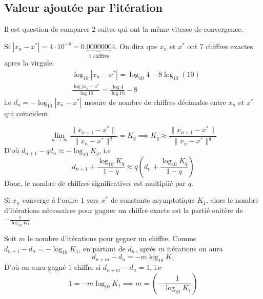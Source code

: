\documentclass[a4paper]{report}
\begin{document}
\subsection{Valeur ajoutée par l'itération}
Il est question de comparer $2$ suites qui ont la même vitesse de convergence.
\begin{remark}
    Si $|x_n - x^*| = 4 \cdot 10^{-8} = 0.\underbrace{0000000}_{7 \text{ chiffres}}4$. On dira que $x_n$ et  $x^*$ ont 7 chiffres exactes apres la virgule.
    \begin{align*}
    &\log_{10} |x_n - x^*| = \log_{10}4 - 8\log_{10}(10)\\
    &\frac{\log|x_n - x^*}{\log 10} = \frac{\log 4}{\log 10} - 8
    \end{align*}
    i.e $d_n = - \log_{10} |x_n - x^*|$ mesure de nombre de chiffres décimales entre $x_n$ et  $x^*$ qui coincident.
\end{remark}
\begin{remark}
   \[
       \lim_{n \to \infty} \frac{\|x_{n+1} - x^*\|}{\|x_n - x^*\|^q} = K_q \implies K_q \approx \frac{\|x_{n+1} - x^*\|}{\|x_n - x^*\|^q}
   \]  
   D'où $d_{n+1} - q d_n \approx -\log_{10} K_q$, i.e
   \[
   d_{n+1} + \frac{\log_{10} K_q}{1 - q} \approx q(d_n + \frac{\log_{10} K_q}{1 - q})
   \] 
   Donc, le nombre de chiffres significatives est multiplié par $q$.
\end{remark}
\begin{prop}
   Si $x_n$ converge à l'ordre  $1$ vers  $x^*$ de constante asymptotique  $K_1$, alors le nombre d'itérations nécessaires pour gagner un chiffre exacte est la partié enitère de  $-\frac{1}{\log_{10}K_1}$ 
\end{prop}
\begin{preuve}
Soit $m$ le nombre d'itérations pour gegner un chiffre. Comme  $d_{n+1} - d_n = -\log_{10} K_1$, en partant de $d_n$, après  $m$ itérations on aura
 \[
     d_{n+m} - d_{n} = -m \log_{10}K_1
\] 
D'où on aura gagné $1$ chiffre si  $d_{n+m} - d_n = 1$, i.e
\[
1 = -m \log_{10}K_1 \implies m = \left( -\frac{1}{\log_{10}K_1} \right) 
\] 
\end{preuve}
\end{document}
